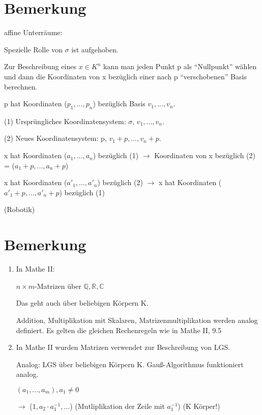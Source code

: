 \documentclass[a4paper, openany]{book}
\begin{document}
    \section{Bemerkung}
    affine Unterräume: 

    Spezielle Rolle von $\sigma$ ist aufgehoben.

    \par \medskip

    Zur Beschreibung eines $x \in K^n$ kann man jeden Punkt p als ``Nullpunkt'' wählen und dann die Koordinaten von x bezüglich einer nach p ``verschobenen'' Basis berechnen.

    \par \medskip

    p hat Koordinaten ($p_1, ..., p_n$) bezüglich Basis $v_1,...,v_n$.

    (1) Ursprüngliches Koordinatensystem: $\sigma$, $v_1,...,v_n$.

    (2) Neues Koordinatensystem: p, $v_1+p,...,v_n+p$.

    \par \medskip

    x hat Koordinaten ($a_1, ..., a_n$) bezüglich (1) $\rightarrow$ Koordinaten von x bezüglich (2) = ($a_1+p, ..., a_n+p$)

    \par \medskip
    x hat Koordinaten ($a'_1,...,a'_n$) bezüglich (2) $\rightarrow$ x hat Koordinaten ($a'_1+p,...,a'_n+p$) bezüglich (1)

    (Robotik)

    \section{Bemerkung}

    \begin{enumerate}[label=(\alph*)]
      \item In Mathe II:

      $n \times m$-Matrizen über $\mathbb{Q,R,C}$

      Das geht auch über beliebigen Körpern K.

      Addition, Multiplikation mit Skalaren, Matrizenmultiplikation werden analog definiert. Es gelten die gleichen Rechenregeln wie in Mathe II, 9.5

      \item In Mathe II wurden Matrizen verwendet zur Beschreibung von LGS.

      Analog: LGS über beliebigen Körpern K. Gauß-Algorithmus funktioniert analog.

      $(a_1,...,a_m), a_1 \neq 0$

      $\rightarrow$ ($1, a_2 \cdot a_1^{-1}, ...$) (Mutliplikation der Zeile mit $a_1^{-1}$) (K Körper!)
    \end{enumerate}
\end{document}
